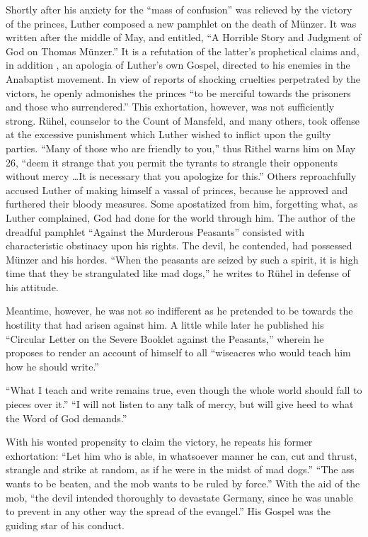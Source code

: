 Shortly after his anxiety for the “mass of confusion” was relieved
by the victory of the princes, Luther composed a new pamphlet on
the death of Münzer. It was written after the middle of May, and
entitled, “A Horrible Story and Judgment of God on Thomas Münzer.”
It is a refutation of the latter’s prophetical claims and, in addition
, an apologia of Luther’s own Gospel, directed to his enemies in
the Anabaptist movement. In view of reports of shocking cruelties
perpetrated by the victors, he openly admonishes the princes “to be
merciful towards the prisoners and those who surrendered.” This
exhortation, however, was not sufficiently strong. Rühel, counselor to
the Count of Mansfeld, and many others, took offense at the excessive
punishment which Luther wished to inflict upon the guilty parties.
“Many of those who are friendly to you,” thus Rithel warns him on
May 26, “deem it strange that you permit the tyrants to strangle
their opponents without mercy \dots It is necessary that you apologize
for this.” Others reproachfully accused Luther of making himself a vassal
of princes, because he approved and furthered their
bloody measures. Some apostatized from him, forgetting what, as
Luther complained, God had done for the world through him. The
author of the dreadful pamphlet “Against the Murderous Peasants''
consisted with characteristic obstinacy upon his rights. The devil, he
contended, had possessed Münzer and his hordes. “When the peasants
are seized by such a spirit, it is high time that they be strangulated
like mad dogs,” he writes to Rühel in defense of his attitude.

Meantime, however, he was not so indifferent as he pretended
to be towards the hostility that had arisen against him. A little while
later he published his “Circular Letter on the Severe Booklet against
the Peasants,” wherein he proposes to render an account of himself to
all “wiseacres who would teach him how he should write.”

“What I teach and write remains true, even though the whole world
should fall to pieces over it.” “I will not listen to any talk of mercy, but
will give heed to what the Word of God demands.”

With his wonted propensity to claim the victory, he repeats his former
exhortation: “Let him who is able, in whatsoever manner he can, cut and
thrust, strangle and strike at random, as if he were in the midst of mad
dogs.” “The ass wants to be beaten, and the mob wants to be ruled by force.”
With the aid of the mob, “the devil intended thoroughly to devastate
Germany, since he was unable to prevent in any other way the spread of the
evangel.” His Gospel was the guiding star of his conduct.

